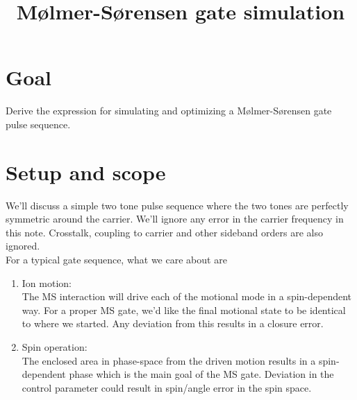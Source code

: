 \documentclass[10pt,fleqn]{article}
\title{M{\o}lmer-S{\o}rensen gate simulation}
\begin{document}
\maketitle

\section{Goal}
Derive the expression for simulating and optimizing a M{\o}lmer-S{\o}rensen gate
pulse sequence.\\

\section{Setup and scope}
We'll discuss a simple two tone pulse sequence where the two tones
are perfectly symmetric around the carrier.
We'll ignore any error in the carrier frequency in this note.
Crosstalk, coupling to carrier and other sideband orders are also ignored.\\

For a typical gate sequence, what we care about are
\begin{enumerate}
\item Ion motion:\\
  The MS interaction will drive each of the motional mode in a spin-dependent way.
  For a proper MS gate, we'd like the final motional state to be identical
  to where we started. Any deviation from this results in a closure error.
\item Spin operation:\\
  The enclosed area in phase-space from the driven motion results in
  a spin-dependent phase which is the main goal of the MS gate.
  Deviation in the control parameter could result in spin/angle error
  in the spin space.
\end{enumerate}
\end{document}
